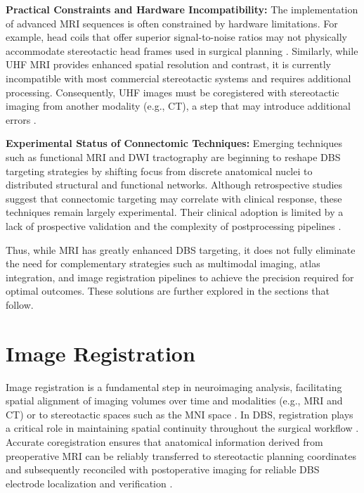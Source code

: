 \textbf{Practical Constraints and Hardware Incompatibility:}
The implementation of advanced MRI sequences is often constrained by hardware limitations. For example, head coils that offer superior signal-to-noise ratios may not physically accommodate stereotactic head frames used in surgical planning \cite{Boutet2021-vg}. Similarly, while UHF MRI provides enhanced spatial resolution and contrast, it is currently incompatible with most commercial stereotactic systems and requires additional processing. Consequently, UHF images must be coregistered with stereotactic imaging from another modality (e.g., CT), a step that may introduce additional errors \cite{Lenglet2012-ii}.

\textbf{Experimental Status of Connectomic Techniques:}
Emerging techniques such as functional MRI and DWI tractography are beginning to reshape DBS targeting strategies by shifting focus from discrete anatomical nuclei to distributed structural and functional networks. Although retrospective studies suggest that connectomic targeting may correlate with clinical response, these techniques remain largely experimental. Their clinical adoption is limited by a lack of prospective validation and the complexity of postprocessing pipelines \cite{Horn2017-bi}.

Thus, while MRI has greatly enhanced DBS targeting, it does not fully eliminate the need for complementary strategies such as multimodal imaging, atlas integration, and image registration pipelines to achieve the precision required for optimal outcomes. These solutions are further explored in the sections that follow.

\section{Image Registration}
\label{sec:registration}
Image registration is a fundamental step in neuroimaging analysis, facilitating spatial alignment of imaging volumes over time and modalities (e.g., MRI and CT) or to stereotactic spaces such as the MNI space \cite{Risholm2011-rm}. In DBS, registration plays a critical role in maintaining spatial continuity throughout the surgical workflow \cite{Geevarghese2016-qo}. Accurate coregistration ensures that anatomical information derived from preoperative MRI can be reliably transferred to stereotactic planning coordinates and subsequently reconciled with postoperative imaging for reliable DBS electrode localization and verification \cite{Lofredi2022-wi,Abbass2025-el}.

